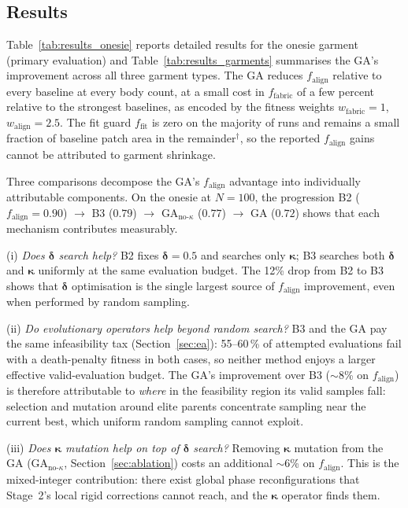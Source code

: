 \subsection{Results}
\label{sec:results}

Table~\ref{tab:results_onesie} reports detailed results for the onesie
garment (primary evaluation) and Table~\ref{tab:results_garments}
summarises the GA's improvement across all three garment types.
The GA reduces $f_\text{align}$ relative to every baseline at every
body count, at a small cost in $f_\text{fabric}$ of a few percent
relative to the strongest baselines, as encoded by the fitness weights
$w_\text{fabric} = 1$, $w_\text{align} = 2.5$.
The fit guard $f_\text{fit}$ is zero on the majority of runs and remains
a small fraction of baseline patch area in the remainder$^\dagger$, so the
reported $f_\text{align}$ gains cannot be attributed to garment shrinkage.

Three comparisons decompose the GA's $f_\text{align}$ advantage into
individually attributable components.
On the onesie at $N=100$, the progression
B2 ($f_\text{align} = 0.90$)
$\rightarrow$ B3 ($0.79$)
$\rightarrow$ $\text{GA}_{\text{no-}\kappa}$ ($0.77$)
$\rightarrow$ GA ($0.72$)
shows that each mechanism contributes measurably.

(i) \emph{Does $\boldsymbol{\delta}$ search help?}
B2 fixes $\boldsymbol{\delta} = 0.5$ and searches only
$\boldsymbol{\kappa}$; B3 searches both
$\boldsymbol{\delta}$ and $\boldsymbol{\kappa}$ uniformly at the same
evaluation budget.
The 12\% drop from B2 to B3 shows that
$\boldsymbol{\delta}$ optimisation is the single largest source of
$f_\text{align}$ improvement, even when performed by random sampling.

(ii) \emph{Do evolutionary operators help beyond random search?}
B3 and the GA pay the same infeasibility tax
(Section~\ref{sec:ea}): 55--60\,\% of attempted evaluations fail with
a death-penalty fitness in both cases, so neither method enjoys a larger
effective valid-evaluation budget.
The GA's improvement over B3 (${\sim}$8\% on $f_\text{align}$) is
therefore attributable to \emph{where} in the feasibility region its
valid samples fall: selection and mutation around elite parents
concentrate sampling near the current best, which uniform random
sampling cannot exploit.

(iii) \emph{Does $\boldsymbol{\kappa}$ mutation help on top of
$\boldsymbol{\delta}$ search?}
Removing $\boldsymbol{\kappa}$ mutation from the GA
($\text{GA}_{\text{no-}\kappa}$, Section~\ref{sec:ablation}) costs
an additional ${\sim}$6\% on $f_\text{align}$.
This is the mixed-integer contribution: there exist global phase
reconfigurations that Stage~2's local rigid corrections cannot
reach, and the $\boldsymbol{\kappa}$ operator finds them.

